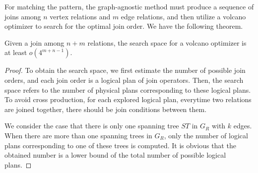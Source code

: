 For matching the pattern, the graph-agnostic method must produce a sequence of joins among $n$ vertex relations and $m$ edge relations, and then utilize a volcano optimizer to search for the optimal join order. We have the following theorem.


\begin{theorem}
    \label{thm:complexity-of-volcano}
    Given a join among $n + m$ relations, the search space for a volcano optimizer is at least $o(4^{m+n-1})$.
\end{theorem}

\begin{proof}
    To obtain the search space, we first estimate the number of possible join orders, and each join order is a logical plan of join operators.
    Then, the search space refers to the number of physical plans corresponding to these logical plans.
    To avoid cross production, for each explored logical plan, everytime two relations are joined together, there should be join conditions between them.


    We consider the case that there is only one spanning tree $ST$ in $G_{R}$ with $k$ edges.
    When there are more than one spanning trees in $G_R$, only the number of logical plans corresponding to one of these trees is computed.
    It is obvious that the obtained number is a lower bound of the total number of possible logical plans.


\end{proof}
